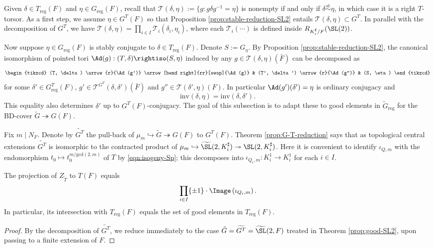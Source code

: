 \documentclass[a4paper,10pt]{article}
\begin{document}
Given $\delta \in T_\text{reg}(F)$ and $\eta \in G_\text{reg}(F)$, recall that $\mathcal{T}(\delta, \eta) := \{g: g\delta g^{-1} = \eta \}$ is nonempty if and only if $\delta \stackrel{\text{st}}{\sim} \eta$, in which case it is a right $T$-torsor. As a first step, we assume $\eta \in G^T(F)$ so that Proposition \ref{prop:stable-reduction-SL2} entails $\mathcal{T}(\delta, \eta) \subset G^T$. In parallel with the decomposition of $G^T$, we have $\mathcal{T}(\delta, \eta) = \prod_{i \in I} \mathcal{T}_i(\delta_i, \eta_i)$, where each $\mathcal{T}_i(\cdots)$ is defined inside $R_{K_i^\sharp/F} (\SL(2))$.

Now suppose $\eta \in G_\text{reg}(F)$ is stably conjugate to $\delta \in T_\text{reg}(F)$. Denote $S := G_\eta$. By Proposition \ref{prop:stable-reduction-SL2}, the canonical isomorphism of pointed tori $\Ad(g): (T, \delta) \rightiso (S, \eta)$ induced by any $g \in \mathcal{T}(\delta, \eta)(\bar{F})$ can be decomposed as
\[\begin{tikzcd}
	(T, \delta) \arrow{r}{\Ad(g')} \arrow[bend right]{rr}[swap]{\Ad(g)} & (T', \delta') \arrow{r}{\Ad(g'')} & (S, \eta)
\end{tikzcd}\]
for some $\delta' \in G^T_\text{reg}(F)$, $g' \in \mathcal{T}^{G^T}(\delta, \delta')(\bar{F})$ and $g'' \in \mathcal{T}(\delta', \eta)(F)$. In particular $\Ad(g')(\delta') = \eta$ is ordinary conjugacy and
\[ \text{inv}(\delta, \eta) = \text{inv}(\delta, \delta'). \]
This equality also determines $\delta'$ up to $G^T(F)$-conjugacy. The goal of this subsection is to adapt these to good elements in $\tilde{G}_\text{reg}$ for the BD-cover $
\tilde{G} \twoheadrightarrow G(F)$.

Fix $m \mid N_F$. Denote by $\widetilde{G^T}$ the pull-back of $\mu_m \hookrightarrow \tilde{G} \twoheadrightarrow G(F)$ to $G^T(F)$. Theorem \ref{prop:G-T-reduction} says that as topological central extensions $\widetilde{G^T}$ is isomorphic to the contracted product of $\mu_m \hookrightarrow \widetilde{\SL}(2, K_i^\sharp) \twoheadrightarrow \SL(2, K_i^\sharp)$. Here it is convenient to identify $\iota_{Q,m}$ with the endomorphism $t_0 \mapsto t_0^{m/\text{gcd}(2,m)}$ of $T$ by \eqref{eqn:isogeny-Sp}; this decomposes into $\iota_{Q_i, m}: K_i^1 \to K_i^1$ for each $i \in I$.

\begin{proposition}\label{prop:good-T}
	The projection of $Z_{\tilde{T}}$ to $T(F)$ equals
	\[ \prod_{i \in I} \{\pm 1 \} \cdot \Image\left( \iota_{Q_i,m} \right). \]
	In particular, its intersection with $T_\mathrm{reg}(F)$ equals the set of good elements in $T_\mathrm{reg}(F)$.
\end{proposition}
\begin{proof}
	By the decomposition of $\widetilde{G^T}$, we reduce immediately to the case $\tilde{G} = \widetilde{G^T} = \widetilde{\SL}(2, F)$ treated in Theorem \ref{prop:good-SL2}, upon passing to a finite extension of $F$.
\end{proof}
\end{document}
